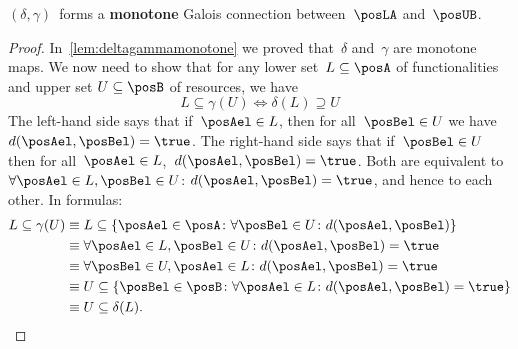 \begin{lemma}
	$(\delta, \gamma)$~forms a \textbf{monotone}
	Galois connection between~$\posLA$ and~$\posUB$.
\end{lemma}
\begin{proof}
	In~\cref{lem:deltagammamonotone} we proved that~$\delta$ and~$\gamma$ are monotone maps.
	We now need to show that for any lower set~$L\subseteq \posA$ of functionalities and upper set $U\subseteq \posB$ of resources, we have
	\begin{equation}
		L\subseteq\gamma(U) \iff \delta(L)\supseteq U
	\end{equation}
	The left-hand side says that if~$\posAel\in L$, then for all~$\posBel \in U$ we have $d(\posAel,\posBel)=\true$.
	The right-hand side says that if~$\posBel\in U$ then for all~$\posAel \in L$,~$d(\posAel,\posBel)=\true$.
	Both are equivalent to~$\forall \posAel\in L,\posBel\in U$: $d(\posAel,\posBel)=\true$, and hence to each other.
	In formulas:
	\begin{equation}
		\begin{aligned}
			L \subseteq \gamma(U) & \equiv L\subseteq \{\posAel \in \posA\colon \forall \posBel\in U\colon d(\posAel,\posBel)\}       \\
			                      & \equiv \forall \posAel\in L, \posBel\in U \colon d(\posAel,\posBel)=\true                         \\
			                      & \equiv \forall \posBel\in U, \posAel\in L \colon d(\posAel,\posBel)=\true                         \\
			                      & \equiv U\subseteq \{\posBel\in \posB\colon \forall \posAel\in L\colon d(\posAel,\posBel)=\true \} \\
			                      & \equiv U\subseteq \delta(L).
		\end{aligned}
	\end{equation}
\end{proof}
